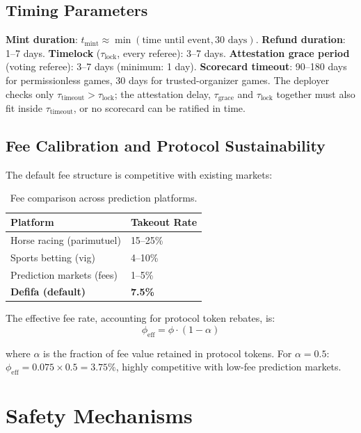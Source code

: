 \documentclass[11pt,a4paper]{article}
\begin{document}
\subsection{Timing Parameters}

\textbf{Mint duration}: $t_{\text{mint}} \approx \min(\text{time until event}, 30\text{ days})$. \textbf{Refund duration}: 1--7 days. \textbf{Timelock} ($\tau_{\text{lock}}$, every referee): 3--7 days. \textbf{Attestation grace period} (voting referee): 3--7 days (minimum: 1 day). \textbf{Scorecard timeout}: 90--180 days for permissionless games, 30 days for trusted-organizer games. The deployer checks only $\tau_{\text{timeout}} > \tau_{\text{lock}}$; the attestation delay, $\tau_{\text{grace}}$ and $\tau_{\text{lock}}$ together must also fit inside $\tau_{\text{timeout}}$, or no scorecard can be ratified in time.

\subsection{Fee Calibration and Protocol Sustainability}

The default fee structure is competitive with existing markets:

\begin{table}[H]
\centering
\begin{tabular}{ll}
\toprule
\textbf{Platform} & \textbf{Takeout Rate} \\
\midrule
Horse racing (parimutuel) & 15--25\% \\
Sports betting (vig) & 4--10\% \\
Prediction markets (fees) & 1--5\% \\
\textbf{Defifa (default)} & \textbf{7.5\%} \\
\bottomrule
\end{tabular}
\caption{Fee comparison across prediction platforms.}
\end{table}

The effective fee rate, accounting for protocol token rebates, is:
\begin{equation}
\phi_{\text{eff}} = \phi \cdot (1 - \alpha)
\end{equation}

where $\alpha$ is the fraction of fee value retained in protocol tokens. For $\alpha = 0.5$: $\phi_{\text{eff}} = 0.075 \times 0.5 = 3.75\%$, highly competitive with low-fee prediction markets.

\section{Safety Mechanisms}
\end{document}
